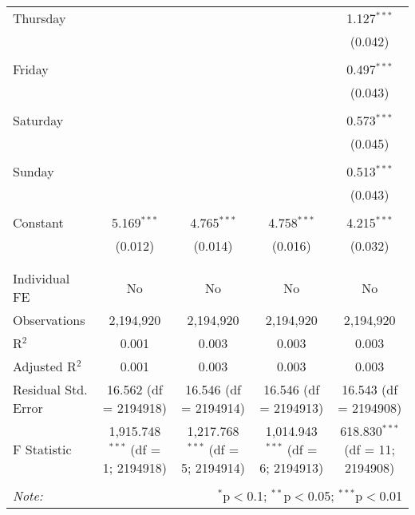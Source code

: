 \documentclass[
]{article}
\begin{document}
\begin{table}[!htbp]
{\begin{tabular}{@{\extracolsep{5pt}}lcccc}
 Thursday &  &  &  & 1.127$^{***}$ \\ 
  &  &  &  & (0.042) \\ 
  & & & & \\ 
 Friday &  &  &  & 0.497$^{***}$ \\ 
  &  &  &  & (0.043) \\ 
  & & & & \\ 
 Saturday &  &  &  & 0.573$^{***}$ \\ 
  &  &  &  & (0.045) \\ 
  & & & & \\ 
 Sunday &  &  &  & 0.513$^{***}$ \\ 
  &  &  &  & (0.043) \\ 
  & & & & \\ 
 Constant & 5.169$^{***}$ & 4.765$^{***}$ & 4.758$^{***}$ & 4.215$^{***}$ \\ 
  & (0.012) & (0.014) & (0.016) & (0.032) \\ 
  & & & & \\ 
\hline \\[-1.8ex] 
Individual FE & No & No & No & No \\ 
Observations & 2,194,920 & 2,194,920 & 2,194,920 & 2,194,920 \\ 
R$^{2}$ & 0.001 & 0.003 & 0.003 & 0.003 \\ 
Adjusted R$^{2}$ & 0.001 & 0.003 & 0.003 & 0.003 \\ 
Residual Std. Error & 16.562 (df = 2194918) & 16.546 (df = 2194914) & 16.546 (df = 2194913) & 16.543 (df = 2194908) \\ 
F Statistic & 1,915.748$^{***}$ (df = 1; 2194918) & 1,217.768$^{***}$ (df = 5; 2194914) & 1,014.943$^{***}$ (df = 6; 2194913) & 618.830$^{***}$ (df = 11; 2194908) \\ 
\hline 
\hline \\[-1.8ex] 
\textit{Note:}  & \multicolumn{4}{r}{$^{*}$p$<$0.1; $^{**}$p$<$0.05; $^{***}$p$<$0.01} \\ 
\end{tabular}
} 
\end{table} 
\newpage
\end{document}
